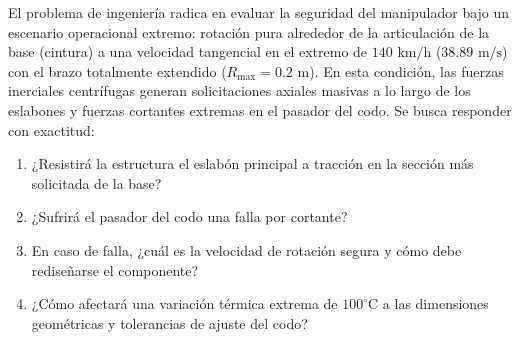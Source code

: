 \documentclass[11pt,a4paper]{article}
\begin{document}
El problema de ingeniería radica en evaluar la seguridad del manipulador bajo un escenario operacional extremo: rotación pura alrededor de la articulación de la base (cintura) a una velocidad tangencial en el extremo de $140\text{ km/h}$ ($38.89\text{ m/s}$) con el brazo totalmente extendido ($R_{\text{max}} = 0.2\text{ m}$). En esta condición, las fuerzas inerciales centrífugas generan solicitaciones axiales masivas a lo largo de los eslabones y fuerzas cortantes extremas en el pasador del codo. Se busca responder con exactitud:
\begin{enumerate}
    \item ¿Resistirá la estructura el eslabón principal a tracción en la sección más solicitada de la base?
    \item ¿Sufrirá el pasador del codo una falla por cortante?
    \item En caso de falla, ¿cuál es la velocidad de rotación segura y cómo debe rediseñarse el componente?
    \item ¿Cómo afectará una variación térmica extrema de $100^\circ$C a las dimensiones geométricas y tolerancias de ajuste del codo?
\end{enumerate}
\end{document}
